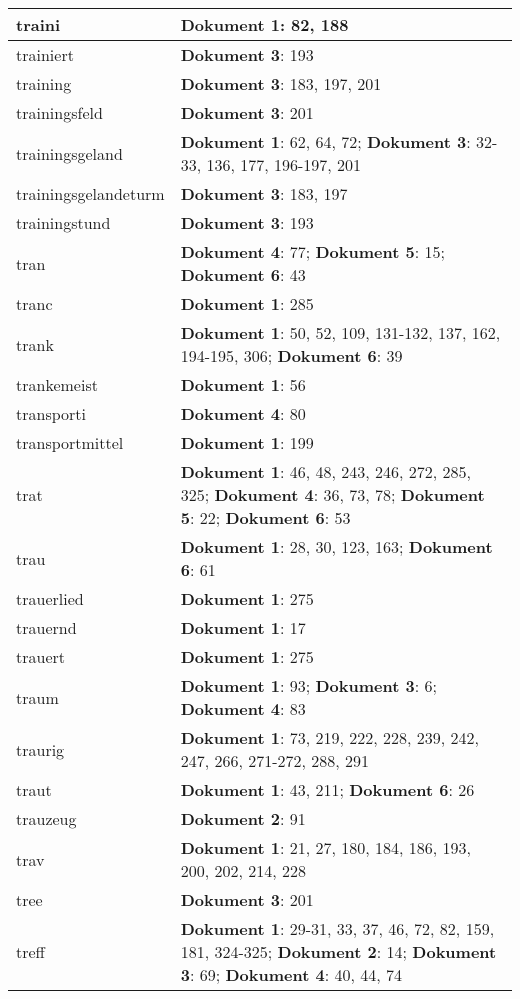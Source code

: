 \documentclass[a5paper]{article}
\begin{document}
\begin{longtable}[l]{|l|p{3in}|}
\hline
traini & \textbf{Dokument 1}: 82, 188 \\
\hline
trainiert & \textbf{Dokument 3}: 193 \\
\hline
training & \textbf{Dokument 3}: 183, 197, 201 \\
\hline
trainingsfeld & \textbf{Dokument 3}: 201 \\
\hline
trainingsgeland & \textbf{Dokument 1}: 62, 64, 72; \textbf{Dokument 3}: 32-33, 136, 177, 196-197, 201 \\
\hline
trainingsgelandeturm & \textbf{Dokument 3}: 183, 197 \\
\hline
trainingstund & \textbf{Dokument 3}: 193 \\
\hline
tran & \textbf{Dokument 4}: 77; \textbf{Dokument 5}: 15; \textbf{Dokument 6}: 43 \\
\hline
tranc & \textbf{Dokument 1}: 285 \\
\hline
trank & \textbf{Dokument 1}: 50, 52, 109, 131-132, 137, 162, 194-195, 306; \textbf{Dokument 6}: 39 \\
\hline
trankemeist & \textbf{Dokument 1}: 56 \\
\hline
transporti & \textbf{Dokument 4}: 80 \\
\hline
transportmittel & \textbf{Dokument 1}: 199 \\
\hline
trat & \textbf{Dokument 1}: 46, 48, 243, 246, 272, 285, 325; \textbf{Dokument 4}: 36, 73, 78; \textbf{Dokument 5}: 22; \textbf{Dokument 6}: 53 \\
\hline
trau & \textbf{Dokument 1}: 28, 30, 123, 163; \textbf{Dokument 6}: 61 \\
\hline
trauerlied & \textbf{Dokument 1}: 275 \\
\hline
trauernd & \textbf{Dokument 1}: 17 \\
\hline
trauert & \textbf{Dokument 1}: 275 \\
\hline
traum & \textbf{Dokument 1}: 93; \textbf{Dokument 3}: 6; \textbf{Dokument 4}: 83 \\
\hline
traurig & \textbf{Dokument 1}: 73, 219, 222, 228, 239, 242, 247, 266, 271-272, 288, 291 \\
\hline
traut & \textbf{Dokument 1}: 43, 211; \textbf{Dokument 6}: 26 \\
\hline
trauzeug & \textbf{Dokument 2}: 91 \\
\hline
trav & \textbf{Dokument 1}: 21, 27, 180, 184, 186, 193, 200, 202, 214, 228 \\
\hline
tree & \textbf{Dokument 3}: 201 \\
\hline
treff & \textbf{Dokument 1}: 29-31, 33, 37, 46, 72, 82, 159, 181, 324-325; \textbf{Dokument 2}: 14; \textbf{Dokument 3}: 69; \textbf{Dokument 4}: 40, 44, 74 \\

\end{longtable}
\end{document}
